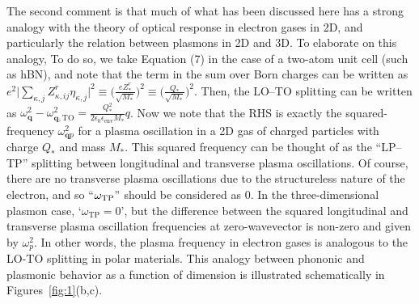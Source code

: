 \documentclass[aps,prb,twocolumn,
	           groupedaddress,superscriptaddress,
               amsfonts,amssymb,amsmath,floatfix,
	           citeautoscript]{revtex4-1}
\makeatletter
\newcommand{\eg}{e.g.\@\xspace}
\newcommand{\comment}[2]{%
    \ifbool{togglecomments}%
    {\textcolor{blue!70!black}{\small\textsf{%
    \textsuperscript{\textsc{\textsf{\MakeLowercase{#1}}}}%
    [#2]}}} %
    {}}     %
\makeatother
\begin{document}
The second comment is that much of what has been discussed here has a strong analogy with the theory of optical response in electron gases in 2D, and particularly the relation between plasmons in 2D and 3D. To elaborate on this analogy, To do so, we take Equation (7) in the case of a two-atom unit cell (such as hBN), and note that the term in the sum over Born charges can be written as $e^2\big|\sum_{\kappa,j}Z^r_{\kappa,ij}\eta_{\kappa,j}  \big|^2 \equiv  \Big(\frac{eZ^r_*}{\sqrt{M_*}}\Big)^2 \equiv \Big(\frac{Q_*}{\sqrt{M_*}}\Big)^2$. Then, the LO--TO splitting can be written as $\omega^2_{\mathbf{q}} - \omega^2_{\mathbf{q},\mathrm{TO}} = \frac{Q_*^2}{2\epsilon_0\epsilon_{\mathrm{env}} M_*}q$. Now we note that the RHS is exactly the squared-frequency $\omega^2_{\mathbf{q}p}$ for a plasma oscillation in a 2D gas of charged particles with charge $Q_*$ and mass $M_*$. This squared frequency can be thought of as the ``LP--TP'' splitting between longitudinal and transverse plasma oscillations. Of course, there are no transverse plasma oscillations due to the structureless nature of the electron, and so ``$\omega_{\mathrm{TP}}"$  should be considered as 0. In the three-dimensional plasmon case, `$\omega_{\mathrm{TP}} = 0$', but the difference between the squared longitudinal and transverse plasma oscillation frequencies at zero-wavevector is non-zero and given by $\omega_p^2$. In other words, the plasma frequency in electron gases is analogous to the LO-TO splitting in polar materials. This analogy between phononic and plasmonic behavior as a function of dimension is illustrated schematically in Figures~\ref{fig:1}(b,c).
  
\end{document}
